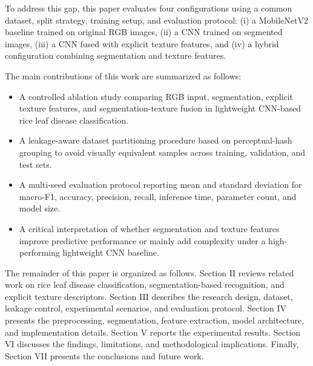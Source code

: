To address this gap, this paper evaluates four configurations using a common dataset, split strategy, training setup, and evaluation protocol: (i) a MobileNetV2 baseline trained on original RGB images, (ii) a CNN trained on segmented images, (iii) a CNN fused with explicit texture features, and (iv) a hybrid configuration combining segmentation and texture features.

The main contributions of this work are summarized as follows:
\begin{itemize}
    \item A controlled ablation study comparing RGB input, segmentation, explicit texture features, and segmentation-texture fusion in lightweight CNN-based rice leaf disease classification.
    \item A leakage-aware dataset partitioning procedure based on perceptual-hash grouping to avoid visually equivalent samples across training, validation, and test sets.
    \item A multi-seed evaluation protocol reporting mean and standard deviation for macro-F1, accuracy, precision, recall, inference time, parameter count, and model size.
    \item A critical interpretation of whether segmentation and texture features improve predictive performance or mainly add complexity under a high-performing lightweight CNN baseline.
\end{itemize}

The remainder of this paper is organized as follows. Section II reviews related work on rice leaf disease classification, segmentation-based recognition, and explicit texture descriptors. Section III describes the research design, dataset, leakage control, experimental scenarios, and evaluation protocol. Section IV presents the preprocessing, segmentation, feature extraction, model architecture, and implementation details. Section V reports the experimental results. Section VI discusses the findings, limitations, and methodological implications. Finally, Section VII presents the conclusions and future work.

